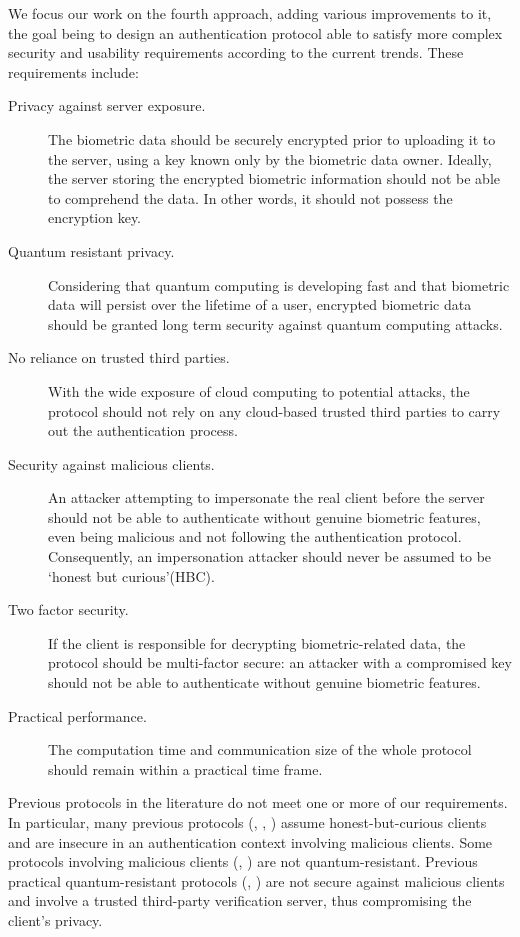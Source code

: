   We focus our work on the fourth approach, adding various improvements to it, the goal
  being to design an authentication protocol able to satisfy more complex security and
  usability requirements according to the current trends. These requirements include:
\begin{description}
\item [Privacy against server exposure.] The biometric data should be securely
  encrypted prior to uploading it to the server, using a key known only by the
  biometric data owner. Ideally, the server storing the encrypted biometric information should
  not be able to comprehend the data. In other words, it should not possess the
  encryption key.

\item [Quantum resistant privacy. ] Considering that quantum computing is developing
  fast and that biometric data will persist over the lifetime of a user,
  encrypted biometric data should be granted long term security against quantum
  computing attacks.
\item [No reliance on trusted third parties. ] With the wide exposure of cloud
  computing to potential attacks, the protocol should not rely on any
  cloud-based trusted third parties to carry out the authentication process.
\item [Security against malicious clients.] An attacker attempting to impersonate
  the real client before the server should not be able to authenticate without
  genuine biometric features, even being malicious and not following the
  authentication protocol. Consequently, an impersonation attacker should never be assumed to
  be `honest but curious'(HBC).
\item [Two factor security.] If the client is responsible for decrypting
  biometric-related data, the protocol should be multi-factor secure: an
  attacker with a compromised key should not be able to authenticate without
  genuine biometric features.
\item [Practical performance.] The computation time and communication size of
  the whole protocol should remain within a practical time frame.
\end{description}
Previous protocols in the literature do not meet one or more of our
requirements. In particular, many previous protocols
(\cite{bringer2007application}, \cite{erkin2009privacy},
\cite{osadchy2010scifi}) assume honest-but-curious clients and are insecure in
an authentication context involving malicious clients. Some protocols
involving malicious clients (\cite{shahandashti2012private},
\cite{vsedvenka2015secure}) are not quantum-resistant. Previous practical
quantum-resistant protocols (\cite{yasuda2014practical},
\cite{mandal2015comprehensive}) are not secure against malicious clients and
involve a trusted third-party verification server, thus compromising the
client's privacy.

